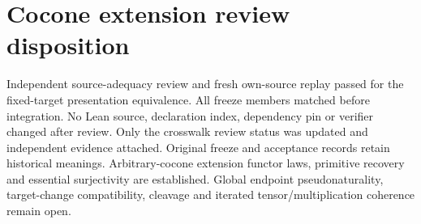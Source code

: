 \documentclass{article}
\begin{document}
\section*{Cocone extension review disposition}
Independent source-adequacy review and fresh own-source replay passed for the fixed-target presentation equivalence. All freeze members matched before integration. No Lean source, declaration index, dependency pin or verifier changed after review. Only the crosswalk review status was updated and independent evidence attached. Original freeze and acceptance records retain historical meanings.
Arbitrary-cocone extension functor laws, primitive recovery and essential surjectivity are established. Global endpoint pseudonaturality, target-change compatibility, cleavage and iterated tensor/multiplication coherence remain open.
\end{document}
